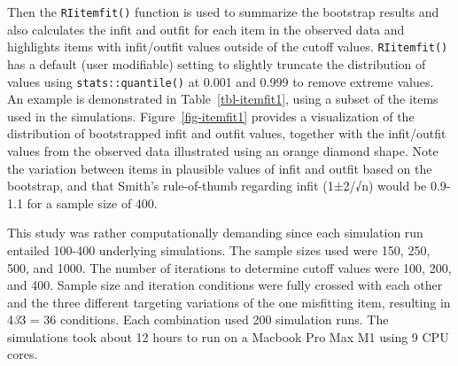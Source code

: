 \documentclass[
  letterpaper,
  DIV=11,
  numbers=noendperiod]{scrartcl}
\begin{document}
Then the \texttt{RIitemfit()} function is used to summarize the
bootstrap results and also calculates the infit and outfit for each item
in the observed data and highlights items with infit/outfit values
outside of the cutoff values. \texttt{RIitemfit()} has a default (user
modifiable) setting to slightly truncate the distribution of values
using \texttt{stats::quantile()} at 0.001 and 0.999 to remove extreme
values. An example is demonstrated in Table~\ref{tbl-itemfit1}, using a
subset of the items used in the simulations. Figure~\ref{fig-itemfit1}
provides a visualization of the distribution of bootstrapped infit and
outfit values, together with the infit/outfit values from the observed
data illustrated using an orange diamond shape. Note the variation
between items in plausible values of infit and outfit based on the
bootstrap, and that Smith's rule-of-thumb regarding infit (1±2/√n) would
be 0.9-1.1 for a sample size of 400.

This study was rather computationally demanding since each simulation
run entailed 100-400 underlying simulations. The sample sizes used were
150, 250, 500, and 1000. The number of iterations to determine cutoff
values were 100, 200, and 400. Sample size and iteration conditions were
fully crossed with each other and the three different targeting
variations of the one misfitting item, resulting in 4\emph{3}3 = 36
conditions. Each combination used 200 simulation runs. The simulations
took about 12 hours to run on a Macbook Pro Max M1 using 9 CPU cores.
\end{document}
